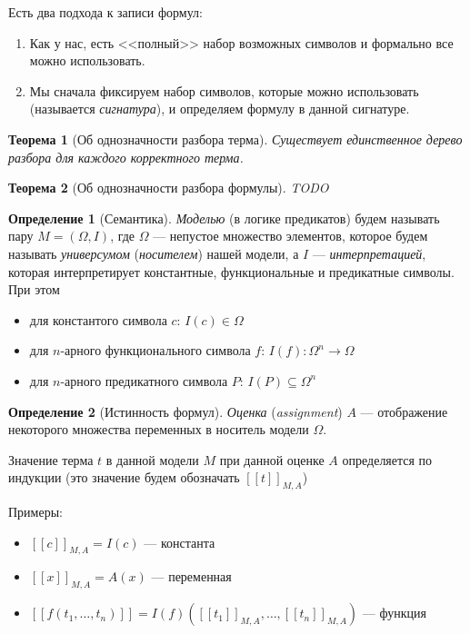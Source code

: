 \documentclass[12pt]{article}
\let\sus\subseteq
\theoremstyle{definition}
\newtheorem{definition}{Определение}[section]
\theoremstyle{plain}
\newtheorem{theorem}{Теорема}[section]
\theoremstyle{remark}
\begin{document}
Есть два подхода к записи формул:
\begin{enumerate}
  \item Как у нас, есть <<полный>> набор возможных символов и
    формально все можно использовать.

  \item Мы сначала фиксируем набор символов, которые можно
    использовать (называется \textit{сигнатура}), и определяем
    формулу в данной сигнатуре.
\end{enumerate}

\begin{theorem}[Об однозначности разбора терма]
  Существует единственное дерево разбора для каждого корректного терма.
\end{theorem}

\begin{theorem}[Об однозначности разбора формулы]
  TODO
\end{theorem}

\begin{definition}[Семантика]
  \textit{Моделью} (в логике предикатов) будем называть пару $M =
  (\Omega, I)$, где $\Omega$ --- непустое множество элементов,
  которое будем называть \textit{универсумом} (\textit{носителем})
  нашей модели, а $I$ --- \textit{интерпретацией}, которая
  интерпретирует константные, функциональные и предикатные символы. При этом
  \begin{itemize}
    \item для константого символа $c$: $I(c) \in \Omega$

    \item для $n$-арного функционального символа $f$: $I(f) :
      \Omega^n \to \Omega$

    \item для $n$-арного предикатного символа $P$: $I(P) \sus \Omega^n$
  \end{itemize}
\end{definition}

\begin{definition}[Истинность формул]
  \textit{Оценка} (\textit{assignment}) $A$ --- отображение
  некоторого множества переменных в носитель модели $\Omega$.

  Значение терма $t$ в данной модели $M$ при данной оценке $A$
  определяется по индукции (это значение будем обозначать $[[t]]_{M,A}$)

  Примеры:
  \begin{itemize}
    \item $[[c]]_{M,A} = I(c)$ --- константа

    \item $[[x]]_{M,A} = A(x)$ --- переменная

    \item $[[f(t_1, \dots, t_n)]] = I(f)([[t_1]]_{M,A}, \dots,
      [[t_n]]_{M,A})$ --- функция
  \end{itemize}
\end{definition}
\end{document}
